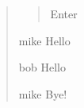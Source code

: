 \documentclass{memoir}
\begin{document}
\begin{verse}

\begin{list}{}{}

\begin{quote}
Enter
\end{quote}

\item[mike] Hello
\item[bob] Hello
\item[mike] Bye!

\end{list}

\end{verse}
\end{document}
